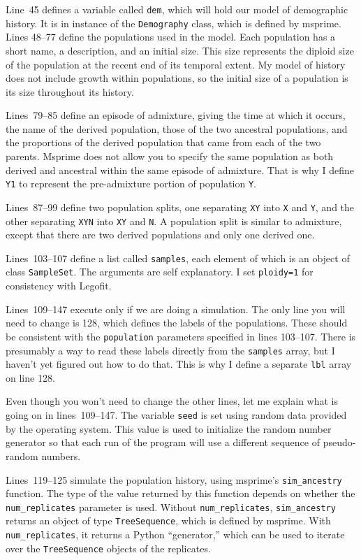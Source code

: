 \documentclass[11pt]{article}
\begin{document}
Line~45 defines a variable called \texttt{dem}, which will hold our
model of demographic history. It is in instance of the
\texttt{Demography} class, which is defined by msprime. Lines 48--77
define the populations used in the model. Each population has a short
name, a description, and an initial size. This size represents the
diploid size of the population at the recent end of its temporal
extent. My model of history does not include growth within
populations, so the initial size of a population is its size
throughout its history.

Lines~79--85 define an episode of admixture, giving the time at which
it occurs, the name of the derived population, those of the two
ancestral populations, and the proportions of the derived population
that came from each of the two parents. Msprime does not allow you to
specify the same population as both derived and ancestral within the
same episode of admixture. That is why I define \texttt{Y1} to
represent the pre-admixture portion of population \texttt{Y}.

Lines~87--99 define two population splits, one separating \texttt{XY}
into \texttt{X} and \texttt{Y}, and the other separating \texttt{XYN}
into \texttt{XY} and \texttt{N}. A population split is similar to
admixture, except that there are two derived populations and only one
derived one.

Lines~103--107 define a list called \texttt{samples}, each element of
which is an object of class \texttt{SampleSet}. The arguments are self
explanatory. I set \texttt{ploidy=1} for consistency with Legofit.

Lines~109--147 execute only if we are doing a simulation. The only
line you will need to change is 128, which defines the labels of the
populations. These should be consistent with the \texttt{population}
parameters specified in lines 103--107. There is presumably a way to
read these labels directly from the \texttt{samples} array, but I
haven't yet figured out how to do that. This is why I define a
separate \texttt{lbl} array on line 128.

Even though you won't need to change the other lines, let me explain
what is going on in lines~109--147. The variable \texttt{seed} is set
using random data provided by the operating system. This value is used
to initialize the random number generator so that each run of the
program will use a different sequence of pseudo-random numbers.

Lines~119--125 simulate the population history, using msprime's
\verb|sim_ancestry| function. The type of the value returned by this
function depends on whether the \verb|num_replicates| parameter is
used. Without \verb|num_replicates|, \verb|sim_ancestry| returns an
object of type \texttt{TreeSequence}, which is defined by
msprime. With \verb|num_replicates|, it returns a Python
``generator,'' which can be used to iterate over the
\texttt{TreeSequence} objects of the replicates.
\end{document}
